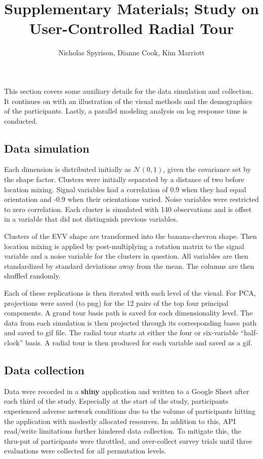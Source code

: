 \documentclass[
]{article}
\title{Supplementary Materials; Study on User-Controlled Radial Tour}
\author{Nicholas Spyrison, Dianne Cook, Kim Marriott}
\date{}
\begin{document}
\maketitle

This section covers some auxiliary details for the data simulation and collection. It continues on with an illustration of the visual methods and the demographics of the participants. Lastly, a parallel modeling analysis on log response time is conducted.

\hypertarget{data-simulation}{%
\subsection{Data simulation}\label{data-simulation}}

Each dimension is distributed initially as \(\mathcal{N}(0, 1)\), given the covariance set by the shape factor. Clusters were initially separated by a distance of two before location mixing. Signal variables had a correlation of 0.9 when they had equal orientation and -0.9 when their orientations varied. Noise variables were restricted to zero correlation. Each cluster is simulated with 140 observations and is offset in a variable that did not distinguish previous variables.

Clusters of the EVV shape are transformed into the banana-chevron shape. Then location mixing is applied by post-multiplying a rotation matrix to the signal variable and a noise variable for the clusters in question. All variables are then standardized by standard deviations away from the mean. The columns are then shuffled randomly.

Each of these replications is then iterated with each level of the visual. For PCA, projections were saved (to png) for the 12 pairs of the top four principal components. A grand tour basis path is saved for each dimensionality level. The data from each simulation is then projected through its corresponding bases path and saved to gif file. The radial tour starts at either the four or six-variable ``half-clock'' basis. A radial tour is then produced for each variable and saved as a gif.

\hypertarget{data-collection}{%
\subsection{Data collection}\label{data-collection}}

Data were recorded in a \textbf{shiny} application and written to a Google Sheet after each third of the study. Especially at the start of the study, participants experienced adverse network conditions due to the volume of participants hitting the application with modestly allocated resources. In addition to this, API read/write limitations further hindered data collection. To mitigate this, the thru-put of participants were throttled, and over-collect survey trials until three evaluations were collected for all permutation levels.
\end{document}

